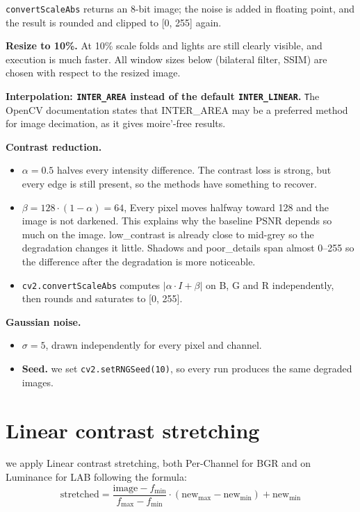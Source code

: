 \documentclass[11pt,a4paper]{article}
\begin{document}
\texttt{convertScaleAbs} returns an 8-bit image; the noise is added in floating point, and the result is rounded and clipped to [0, 255] again.

\textbf{Resize to 10\%.} At 10\% scale folds and lights are still clearly visible, and execution is much faster. All window sizes below (bilateral filter, SSIM) are chosen with respect to the resized image.

\textbf{Interpolation: \texttt{INTER\_AREA} instead of the default \texttt{INTER\_LINEAR}.} \texttt The OpenCV documentation states that INTER\_AREA may be a preferred method for image decimation, as it gives moire'-free results. 

\textbf{Contrast reduction.}
\begin{itemize}
  \item $\alpha = 0.5$ halves every intensity difference. The contrast loss is strong, but every edge is still present, so the methods have something to recover.
  \item $\beta = 128\cdot(1 - \alpha) = 64$, Every pixel moves halfway toward 128 and the image is not darkened.
  This explains why the baseline PSNR depends so much on the image. low\_contrast is already close to mid-grey so the degradation changes it little.
  Shadows and poor\_details span almost 0--255 so the difference after the degradation is more noticeable.
  \item \texttt{cv2.convertScaleAbs} computes $|\alpha\cdot I + \beta|$ on B, G and R independently, then rounds and saturates to [0, 255].
\end{itemize}

\textbf{Gaussian noise.}
\begin{itemize}
  \item $\sigma = 5$, drawn independently for every pixel and channel.
  \item \textbf{Seed.} we set \texttt{cv2.setRNGSeed(10)}, so every run produces the same degraded images.
\end{itemize}

\section{Linear contrast stretching}
we apply Linear contrast stretching, both Per-Channel for BGR and on Luminance for LAB
following the formula:
\[
\text{stretched} = \frac{\text{image} - f_{\min}}{f_{\max} - f_{\min}} \cdot (\text{new}_{\max} - \text{new}_{\min}) + \text{new}_{\min}
\]
\end{document}
